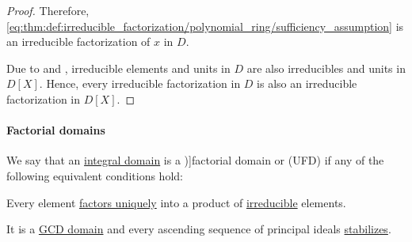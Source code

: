 \begin{proof}
  Therefore, \eqref{eq:thm:def:irreducible_factorization/polynomial_ring/sufficiency_assumption} is an irreducible factorization of \( x \) in \( D \).

  \NecessitySubProof* Due to  and , irreducible elements and units in \( D \) are also irreducibles and units in \( D[X] \). Hence, every irreducible factorization in \( D \) is also an irreducible factorization in \( D[X] \).
\end{proof}

\paragraph{Factorial domains}

\begin{definition}\label{def:factorial_domain}
  We say that an \hyperref[def:integral_domain]{integral domain} is a \term[ru=факториальное кольцо (\cite[def. 9.7.1]{Винберг2014КурсАлгебры})]{factorial domain} or  (UFD) if any of the following equivalent conditions hold:
  \begin{thmenum}
     Every element \hyperref[def:irreducible_factorization/unique]{factors uniquely} into a product of \hyperref[def:domain_divisibility/irreducible]{irreducible} elements.

     It is a \hyperref[def:gcd_domain]{GCD domain} and every ascending sequence of principal ideals \hyperref[def:stabilizing_sequence]{stabilizes}.
  \end{thmenum}
\end{definition}
